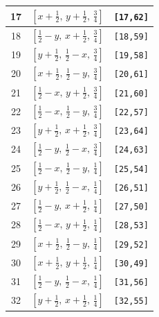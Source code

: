 \documentclass[fleqn,8pt]{jsarticle}
\begin{document}
\begin{longtable}{ccc}
17 & $\left[ x + \frac{1}{2},\, y + \frac{1}{2},\, \frac{3}{4} \right]$ & {\tt [17,62]} \\ \hline
18 & $\left[ \frac{1}{2} - y,\, x + \frac{1}{2},\, \frac{3}{4} \right]$ & {\tt [18,59]} \\ \hline
19 & $\left[ y + \frac{1}{2},\, \frac{1}{2} - x,\, \frac{3}{4} \right]$ & {\tt [19,58]} \\ \hline
20 & $\left[ x + \frac{1}{2},\, \frac{1}{2} - y,\, \frac{3}{4} \right]$ & {\tt [20,61]} \\ \hline
21 & $\left[ \frac{1}{2} - x,\, y + \frac{1}{2},\, \frac{3}{4} \right]$ & {\tt [21,60]} \\ \hline
22 & $\left[ \frac{1}{2} - x,\, \frac{1}{2} - y,\, \frac{3}{4} \right]$ & {\tt [22,57]} \\ \hline
23 & $\left[ y + \frac{1}{2},\, x + \frac{1}{2},\, \frac{3}{4} \right]$ & {\tt [23,64]} \\ \hline
24 & $\left[ \frac{1}{2} - y,\, \frac{1}{2} - x,\, \frac{3}{4} \right]$ & {\tt [24,63]} \\ \hline
25 & $\left[ \frac{1}{2} - x,\, \frac{1}{2} - y,\, \frac{1}{4} \right]$ & {\tt [25,54]} \\ \hline
26 & $\left[ y + \frac{1}{2},\, \frac{1}{2} - x,\, \frac{1}{4} \right]$ & {\tt [26,51]} \\ \hline
27 & $\left[ \frac{1}{2} - y,\, x + \frac{1}{2},\, \frac{1}{4} \right]$ & {\tt [27,50]} \\ \hline
28 & $\left[ \frac{1}{2} - x,\, y + \frac{1}{2},\, \frac{1}{4} \right]$ & {\tt [28,53]} \\ \hline
29 & $\left[ x + \frac{1}{2},\, \frac{1}{2} - y,\, \frac{1}{4} \right]$ & {\tt [29,52]} \\ \hline
30 & $\left[ x + \frac{1}{2},\, y + \frac{1}{2},\, \frac{1}{4} \right]$ & {\tt [30,49]} \\ \hline
31 & $\left[ \frac{1}{2} - y,\, \frac{1}{2} - x,\, \frac{1}{4} \right]$ & {\tt [31,56]} \\ \hline
32 & $\left[ y + \frac{1}{2},\, x + \frac{1}{2},\, \frac{1}{4} \right]$ & {\tt [32,55]} \\
\end{longtable}
\renewcommand{\arraystretch}{1.2}
\end{document}
